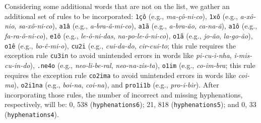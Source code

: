 


Considering some additional words that are not on the list, we gather an additional set of rules to 
be incorporated: 
\texttt{1çô} (e.g., \emph{ma-çô-ni-co}), 
\texttt{1xô} (e.g., \emph{a-xô-nio}, \emph{sa-xô-ni-co}),
\texttt{a1â} (e.g., \emph{a-bra-â-mi-co}), 
\texttt{a1ã} (e.g., \emph{a-bra-ão}, \emph{ca-na-ã}), 
\texttt{a1ô} (e.g., \emph{fa-ra-ô-ni-co}), 
\texttt{e1ô} (e.g., \emph{le-ô-ni-das}, \emph{na-po-le-ô-ni-co}),
\texttt{o1ã} (e.g., \emph{jo-ão}, \emph{la-go-ão}),
\texttt{o1ê} (e.g., \emph{bo-ê-mi-o}),
\texttt{cu2i} (e.g., \emph{cui-da-do}, \emph{cir-cui-to}; this rule requires the exception rule \texttt{cu3in} to avoid unintended errors in words like \emph{pi-cu-i-nha}, \emph{i-mis-cu-in-do}), 
\texttt{.ne4o} (e.g., \emph{neo-li-be-ral}, \emph{neo-na-zis-ta}),
\texttt{o1im} (e.g., \emph{co-im-bra}; this rule requires the exception rule \texttt{co2ima} to avoid unintended errors in words like \emph{coi-ma}),
\texttt{o2i1na} (e.g., \emph{boi-na}, \emph{coi-na}), and 
\texttt{pro1i1b} (e.g., \emph{pro-i-bir}).
After incorporating those rules, the number of incorrect and missing hyphenations, respectively,
will be: 0, 538 (\texttt{hyphenations6}); 21, 818 (\texttt{hyphenations5}); and 0, 33 (\texttt{hyphenations4}). 


